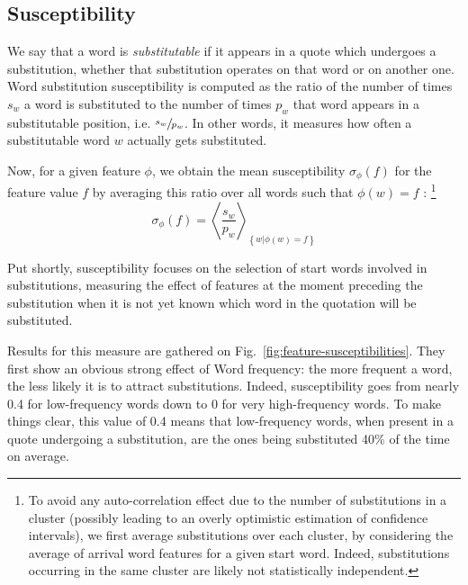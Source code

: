 \subsection{Susceptibility}

We say that a word is \emph{substitutable} if it appears in a quote which undergoes a substitution, whether that substitution operates on that word or on another one.
Word substitution susceptibility is computed as the ratio of the number of times $s_w$ a word is substituted to the number of times $p_w$ that word appears in a substitutable position, \hbox{i.e.} $\sfrac{s_w}{p_w}$. In other words, it measures how often a substitutable word $w$ actually gets substituted.

Now, for a given feature $\phi$, we obtain the mean susceptibility $\sigma_{\phi}(f)$ for the feature value $f$ by averaging this ratio over all words such that $\phi(w) = f$%
:
\footnote{To avoid any auto-correlation effect due to the number of substitutions in a cluster (possibly leading to an overly optimistic estimation of confidence intervals), we first average substitutions over each cluster, by considering the average of arrival word features for a given start word.
Indeed, substitutions occurring in the same cluster are likely not statistically independent.}
$$\sigma_{\phi}(f) = \left< \frac{s_w}{p_w} \right>_{\left\lbrace w | \phi(w) = f \right\rbrace}$$

Put shortly, susceptibility focuses on the selection of start words involved in substitutions, measuring the effect of features at the moment preceding the substitution when it is not yet known which word in the quotation will be substituted.

\medskip
Results for this measure are gathered on Fig.~\ref{fig:feature-susceptibilities}. They first show an obvious strong effect of Word frequency: the more frequent a word, the less likely it is to attract substitutions.
Indeed, susceptibility goes from nearly 0.4 for low-frequency words down to 0 for very high-frequency words.
To make things clear, this value of 0.4 means that low-frequency words, when present in a quote undergoing a substitution, are the ones being substituted 40\% of the time on average.

